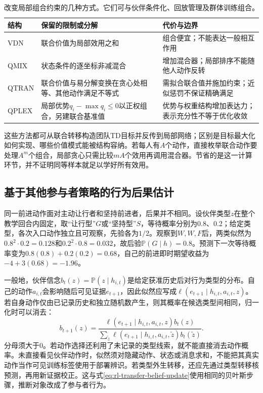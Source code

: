 \begin{table}[htbp]
 \centering
 \begin{tabularx}{\linewidth}{@{}l >{\raggedright\arraybackslash}X >{\raggedright\arraybackslash}X@{}}
 \toprule
 结构 & 保留的限制或分解 & 代价与边界\\
 \midrule
 VDN & 联合价值为局部效用之和 & 组合便宜；不能表达一般相互作用\\
 QMIX & 状态条件的逐坐标非减混合 & 增加混合器；局部排序不能随他人动作反转\\
 QTRAN & 联合价值与易分解变换在贪心处相等、其他动作满足不等式 & 需拟合联合值并施加约束；近似惩罚不保证精确满足\\
 QPLEX & 局部优势$q_i-\max q_i\leq0$以正权组合，另建联合基准值 & 优势与权重结构增加表达力；表示充分性不等于优化收敛\\
 \bottomrule
 \end{tabularx}
 \caption{改变局部组合约束的几种方式。它们可与伙伴条件化、回放管理及群体训练组合。}
 \label{tab:rl-multi-agent-factorization}
\end{table}

这些方法都可从联合转移构造团队TD目标并反传到局部网络；区别是目标最大化如何实现、哪些价值模式能被结构容纳。若每人有$A$个动作，直接枚举联合动作要处理$A^m$个组合，局部贪心只需比较$mA$个效用再调用混合器。节省的是这一计算环节，并不证明同等样本就足以学好所有效用。

\subsection{基于其他参与者策略的行为后果估计}
\label{sec:rl-multi-agent-opponent-model}

同一前进动作面对主动让行者和坚持前进者，后果并不相同。设伙伴类型$z$在整个教学回合内固定，取“让行型”$G$或“坚持型”$S$，等待概率分别为0.8、0.2；给定类型，各次入口动作独立且可观察，先验各为$1/2$。观察到$W,W,F$后，两类似然为$0.8^2\cdot0.2=0.128$和$0.2^2\cdot0.8=0.032$，故后验$\mathbb P(G\mid h)=0.8$。预测下一次等待概率变为$0.8(0.8)+0.2(0.2)=0.68$，自己的前进即时期望收益为$-4+3(0.68)=-1.96$。

一般地，伙伴信念$b_t(z)=\mathbb P(z\mid h_{i,t})$是给定获准历史后对行为类型的分布。自己的动作$a_{i,t}$会影响随后可见证据$e_{t+1}$，因此似然应写成$\ell(e_{t+1}\mid h_{i,t},a_{i,t},z)$。若自身动作仅由已记录历史和独立随机数产生，则其概率在候选类型间相同，归一化时可以消去：
\[
 b_{t+1}(z)=
 \frac{\ell(e_{t+1}\mid h_{i,t},a_{i,t},z)b_t(z)}
      {\sum_{\tilde z}\ell(e_{t+1}\mid h_{i,t},a_{i,t},\tilde z)b_t(\tilde z)}.
\]
分母须大于0。若动作选择还利用了未记录的类型线索，就不能直接消去动作概率。未直接看见伙伴动作时，似然须对隐藏动作、状态或消息求和，不能把其真实动作当作可见训练标签使用于部署辨识。若类型外生转移，还应先通过类型转移核预测，再用新证据校正。这与式\eqref{eq:rl-transfer-belief-update}使用相同的贝叶斯步骤，推断对象改成了参与者行为。

